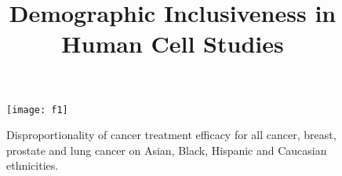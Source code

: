 \documentclass[10pt]{article}
\title{Demographic Inclusiveness in Human Cell Studies}
\begin{document}
\maketitle






\begin{figure}[h!] 
\centering
\texttt{[image: f1]}
\caption{\label{pcbg} Disproportionality of cancer treatment efficacy for all cancer, breast, prostate and lung cancer on Asian, Black, Hispanic and Caucasian ethnicities.} 
\end{figure}






\enddocument
\end{document}
